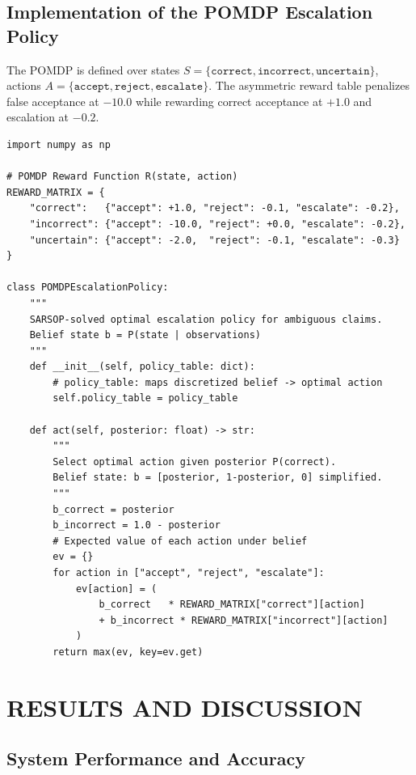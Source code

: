 \documentclass[12pt,a4paper]{report}
\begin{document}
\section{Implementation of the POMDP Escalation Policy}

The POMDP is defined over states $S = \{\texttt{correct}, \texttt{incorrect}, \texttt{uncertain}\}$, actions $A = \{\texttt{accept}, \texttt{reject}, \texttt{escalate}\}$. The asymmetric reward table penalizes false acceptance at $-10.0$ while rewarding correct acceptance at $+1.0$ and escalation at $-0.2$.

\begin{lstlisting}[caption={POMDP Reward Matrix and Policy Lookup},
                   label={lst:pomdp}]
import numpy as np

# POMDP Reward Function R(state, action)
REWARD_MATRIX = {
    "correct":   {"accept": +1.0, "reject": -0.1, "escalate": -0.2},
    "incorrect": {"accept": -10.0, "reject": +0.0, "escalate": -0.2},
    "uncertain": {"accept": -2.0,  "reject": -0.1, "escalate": -0.3}
}

class POMDPEscalationPolicy:
    """
    SARSOP-solved optimal escalation policy for ambiguous claims.
    Belief state b = P(state | observations)
    """
    def __init__(self, policy_table: dict):
        # policy_table: maps discretized belief -> optimal action
        self.policy_table = policy_table

    def act(self, posterior: float) -> str:
        """
        Select optimal action given posterior P(correct).
        Belief state: b = [posterior, 1-posterior, 0] simplified.
        """
        b_correct = posterior
        b_incorrect = 1.0 - posterior
        # Expected value of each action under belief
        ev = {}
        for action in ["accept", "reject", "escalate"]:
            ev[action] = (
                b_correct   * REWARD_MATRIX["correct"][action]
                + b_incorrect * REWARD_MATRIX["incorrect"][action]
            )
        return max(ev, key=ev.get)
\end{lstlisting}

\chapter{RESULTS AND DISCUSSION}

\section{System Performance and Accuracy}
\end{document}
